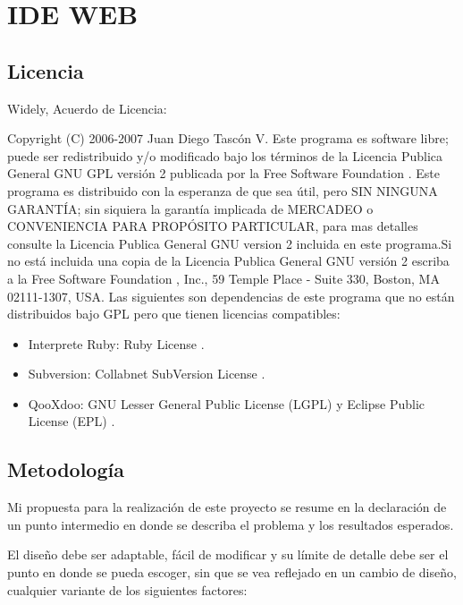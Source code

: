 \section{IDE WEB}

\subsection{Licencia}

Widely, Acuerdo de Licencia:\newline

Copyright (C) 2006-2007 Juan Diego Tascón V. \newline Este programa es software libre; puede ser redistribuido y/o modificado bajo los términos de la Licencia Publica General GNU GPL versión 2 \cite{gpl} publicada por la Free Software Foundation \cite{fsf}. \newline Este programa es distribuido con la esperanza de que sea útil, pero SIN NINGUNA GARANTÍA; sin siquiera la garantía implicada de MERCADEO o CONVENIENCIA PARA PROPÓSITO PARTICULAR, para mas detalles consulte la Licencia Publica General GNU version 2 incluida en este programa.\newline Si no está incluida una copia de la Licencia Publica General GNU versión 2 \cite{gpl} escriba a la Free Software Foundation \cite{fsf}, Inc., 59 Temple Place - Suite 330, Boston, MA  02111-1307, USA. \newline Las siguientes son dependencias de este programa que no están distribuidos bajo GPL pero que tienen licencias compatibles:

\begin{itemize}
	\item Interprete Ruby: Ruby License \cite{ruby_lic}.
	\item Subversion: Collabnet SubVersion License \cite{svn_lic}.
	\item QooXdoo: GNU Lesser General Public License (LGPL) \cite{lgpl} y Eclipse Public License (EPL) \cite{epl}.
\end{itemize}

\subsection{Metodología}

Mi propuesta para la realización de este proyecto se resume en la declaración de un punto intermedio en donde se describa el problema y los resultados esperados.

El diseño debe ser adaptable, fácil de modificar y su límite de detalle debe ser el punto en donde se pueda escoger, sin que se vea reflejado en un cambio de diseño, cualquier variante de los siguientes factores:

